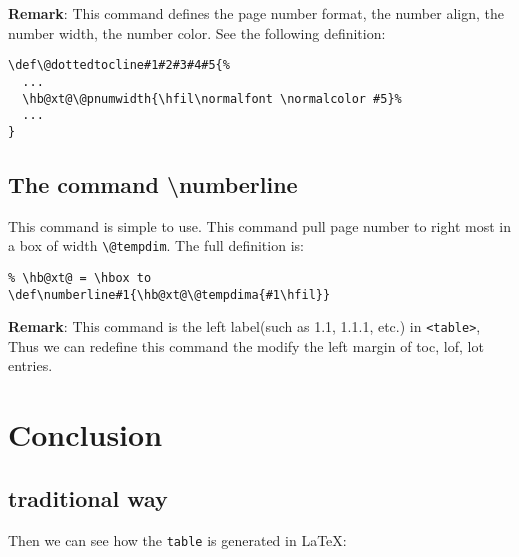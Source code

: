 \documentclass{article}
\begin{document}
\textbf{Remark}: This command defines the page number format, the number align, the number width, the number color. See the 
following definition:
\begin{lstlisting}
\def\@dottedtocline#1#2#3#4#5{%
  ...
  \hb@xt@\@pnumwidth{\hfil\normalfont \normalcolor #5}%
  ...
}
\end{lstlisting}


\subsection{The command \textbackslash numberline}
This command is simple to use. This command pull page number to right most in a box of width \verb|\@tempdim|. The 
full definition is:

\begin{lstlisting}
% \hb@xt@ = \hbox to 
\def\numberline#1{\hb@xt@\@tempdima{#1\hfil}}
\end{lstlisting}

\textbf{Remark}: This command is the left label(such as 1.1, 1.1.1, etc.) in \verb|<table>|, Thus we can redefine this 
command the modify the left margin of toc, lof, lot entries.



\section{Conclusion}
\subsection{traditional way}
Then we can see how the \verb|table| is generated in \LaTeX{}:
\end{document}
